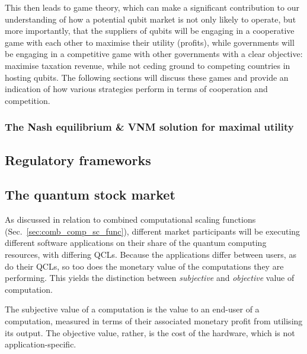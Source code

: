 This then leads to game theory, which can make a significant contribution to our understanding of how a potential qubit market is not only likely to operate, but more importantly, that the suppliers of qubits will be engaging in a cooperative game with each other to maximise their utility (profits), while governments will be engaging in a competitive game with other governments with a clear objective: maximise taxation revenue, while not ceding ground to competing countries in hosting qubits. The following sections will discuss these games and provide an indication of how various strategies perform in terms of cooperation and competition.

\subsubsection{The Nash equilibrium \& VNM solution for maximal utility}


%
%

\subsection{Regulatory frameworks} 


%
%

\subsection{The quantum stock market}

As discussed in relation to combined computational scaling functions (Sec.~\ref{sec:comb_comp_sc_func}), different market participants will be executing different software applications on their share of the quantum computing resources, with differing QCLs. Because the applications differ between users, as do their QCLs, so too does the monetary value of the computations they are performing. This yields the distinction between \textit{subjective} and \textit{objective} value of computation.

The subjective value of a computation is the value to an end-user of a computation, measured in terms of their associated monetary profit from utilising its output. The objective value, rather, is the cost of the hardware, which is not application-specific.

